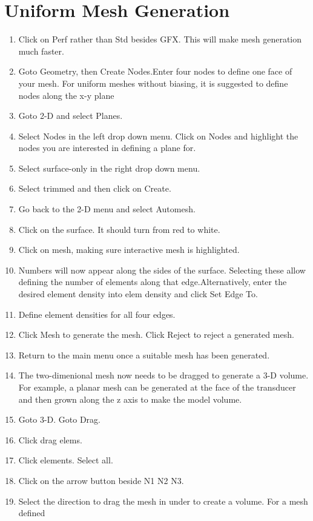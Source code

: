 \documentclass[12pt]{article}
\begin{document}
\section*{Uniform Mesh Generation}
\vspace*{10Pt}
\noindent
\begin{enumerate}
\item Click on Perf rather than Std besides GFX. This will make mesh generation much faster.
\item Goto Geometry, then Create Nodes.Enter four nodes to define one face of your mesh.
For uniform meshes without biasing, it is suggested to define nodes along the x-y plane
\item Goto 2-D and select Planes. 
\item Select Nodes in the left drop down menu. Click on Nodes and highlight the nodes 
you are interested in defining a plane for.
\item Select surface-only in the right drop down menu. 
\item Select trimmed and then click on Create.
\item Go back to the 2-D menu and select Automesh.
\item Click on the surface. It should turn from red to white.
\item Click on mesh, making sure interactive mesh is highlighted.
\item Numbers will now appear along the sides of the surface. Selecting these allow defining
the number of elements along that edge.Alternatively, enter the desired element density into
elem density and click Set Edge To.
\item Define element densities for all four edges.
\item Click Mesh to generate the mesh. Click Reject to reject a generated mesh.
\item Return to the main menu once a suitable mesh has been generated.
\item The two-dimenional mesh now needs to be dragged to generate a 3-D volume. For example,
a planar mesh can be generated at the face of the transducer and then grown along the z axis
to make the model volume.
\item Goto 3-D. Goto Drag.
\item Click drag elems.
\item Click elements. Select all. 
\item Click on the arrow button beside N1 N2 N3.
\item Select the direction to drag the mesh in under to create a volume. For a mesh defined

\end{enumerate}
\end{document}
